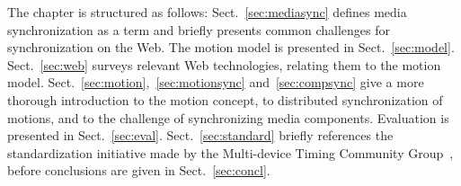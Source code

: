 The chapter is structured as follows: Sect.~\ref{sec:mediasync} defines media
synchronization as a term and briefly presents common challenges for synchronization on the Web. The motion
model is presented in Sect.~\ref{sec:model}. Sect.~\ref{sec:web} surveys relevant Web technologies, relating
them to the motion model. Sect.~\ref{sec:motion},~\ref{sec:motionsync} and~\ref{sec:compsync} give a more
thorough introduction to the motion concept, to distributed synchronization of
motions, and to the challenge of synchronizing media components. Evaluation is
presented in Sect.~\ref{sec:eval}. Sect.~\ref{sec:standard} briefly references
the standardization initiative made by the Multi-device Timing Community
Group~\cite{mtcg}, before conclusions are given in Sect.~\ref{sec:concl}.
